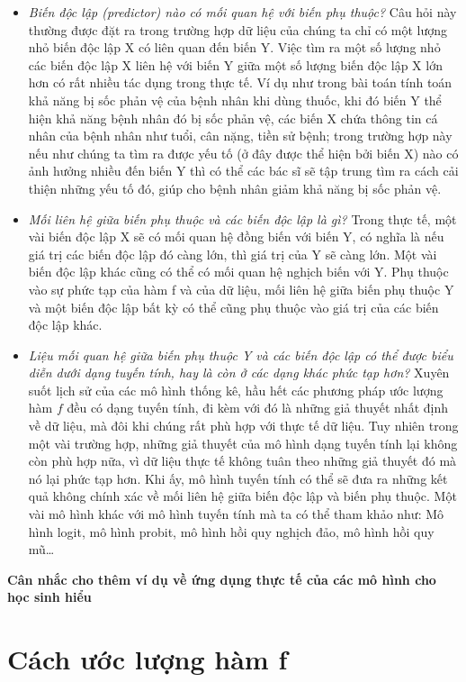 \documentclass[
  12pt,
]{krantz}
\providecommand{\tightlist}{%
  \setlength{\itemsep}{0pt}\setlength{\parskip}{0pt}}
\begin{document}
\begin{itemize}
\tightlist
\item
  \emph{Biến độc lập (predictor) nào có mối quan hệ với biến phụ thuộc?} Câu hỏi này thường được đặt ra trong trường hợp dữ liệu của chúng ta chỉ có một lượng nhỏ biến độc lập X có liên quan đến biến Y. Việc tìm ra một số lượng nhỏ các biến độc lập X liên hệ với biến Y giữa một số lượng biến độc lập X lớn hơn có rất nhiều tác dụng trong thực tế. Ví dụ như trong bài toán tính toán khả năng bị sốc phản vệ của bệnh nhân khi dùng thuốc, khi đó biến Y thể hiện khả năng bệnh nhân đó bị sốc phản vệ, các biến X chứa thông tin cá nhân của bệnh nhân như tuổi, cân nặng, tiền sử bệnh; trong trường hợp này nếu như chúng ta tìm ra được yếu tố (ở đây được thể hiện bởi biến X) nào có ảnh hưởng nhiều đến biến Y thì có thể các bác sĩ sẽ tập trung tìm ra cách cải thiện những yếu tố đó, giúp cho bệnh nhân giảm khả năng bị sốc phản vệ.
\item
  \emph{Mối liên hệ giữa biến phụ thuộc và các biến độc lập là gì?} Trong thực tế, một vài biến độc lập X sẽ có mối quan hệ đồng biến với biến Y, có nghĩa là nếu giá trị các biến độc lập đó càng lớn, thì giá trị của Y sẽ càng lớn. Một vài biến độc lập khác cũng có thể có mối quan hệ nghịch biến với Y. Phụ thuộc vào sự phức tạp của hàm f và của dữ liệu, mối liên hệ giữa biến phụ thuộc Y và một biến độc lập bất kỳ có thể cũng phụ thuộc vào giá trị của các biến độc lập khác.
\item
  \emph{Liệu mối quan hệ giữa biến phụ thuộc Y và các biến độc lập có thể được biểu diễn dưới dạng tuyến tính, hay là còn ở các dạng khác phức tạp hơn?} Xuyên suốt lịch sử của các mô hình thống kê, hầu hết các phương pháp ước lượng hàm \(f\) đều có dạng tuyến tính, đi kèm với đó là những giả thuyết nhất định về dữ liệu, mà đôi khi chúng rất phù hợp với thực tế dữ liệu. Tuy nhiên trong một vài trường hợp, những giả thuyết của mô hình dạng tuyến tính lại không còn phù hợp nữa, vì dữ liệu thực tế không tuân theo những giả thuyết đó mà nó lại phức tạp hơn. Khi ấy, mô hình tuyến tính có thể sẽ đưa ra những kết quả không chính xác về mối liên hệ giữa biến độc lập và biến phụ thuộc. Một vài mô hình khác với mô hình tuyến tính mà ta có thể tham khảo như: Mô hình logit, mô hình probit, mô hình hồi quy nghịch đảo, mô hình hồi quy mũ\ldots{}
\end{itemize}

\textbf{Cân nhắc cho thêm ví dụ về ứng dụng thực tế của các mô hình cho học sinh hiểu}

\hypertarget{cuxe1ch-ux1b0ux1edbc-lux1b0ux1ee3ng-huxe0m-f}{%
\section{Cách ước lượng hàm f}\label{cuxe1ch-ux1b0ux1edbc-lux1b0ux1ee3ng-huxe0m-f}}
\end{document}
